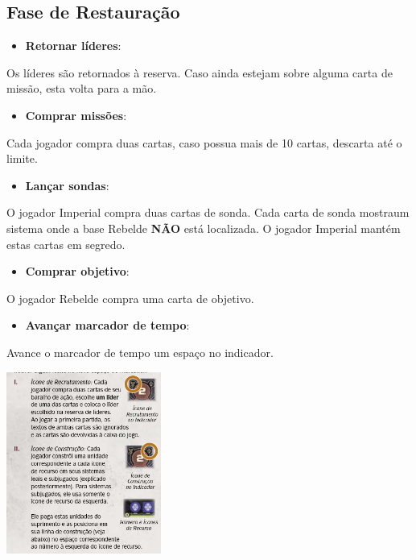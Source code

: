 \documentclass[11pt]{article}
\begin{document}
\subsection{Fase de Restauração}
\label{sec:orgf2d30bf}

\begin{itemize}
\item \textbf{Retornar líderes}:
\end{itemize}

Os líderes são retornados à reserva. Caso ainda estejam sobre alguma carta de missão, esta volta para a mão.

\begin{itemize}
\item \textbf{Comprar missões}:
\end{itemize}

Cada jogador compra duas cartas, caso possua mais de 10 cartas, descarta até o limite.

\begin{itemize}
\item \textbf{Lançar sondas}:
\end{itemize}

O jogador Imperial compra duas cartas de sonda. Cada carta de sonda mostraum sistema onde a base Rebelde \textbf{NÃO} está localizada. O jogador Imperial mantém estas cartas em segredo.

\begin{itemize}
\item \textbf{Comprar objetivo}:
\end{itemize}

O jogador Rebelde compra uma carta de objetivo.

\begin{itemize}
\item \textbf{Avançar marcador de tempo}:
\end{itemize}

Avance o marcador de tempo um espaço no indicador.

\begin{center}
\includegraphics[width=2.0in]{./time-marker.png}
\end{center}
\end{document}
